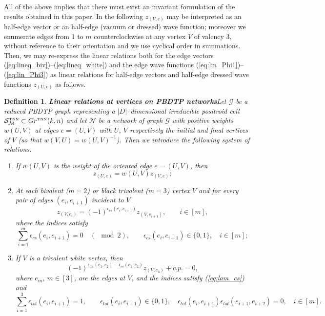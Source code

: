 \documentclass[11pt]{amsart}
\theoremstyle{plain}
\numberwithin{equation}{section}
\newtheorem{definition}{Definition}[subsection]
\def \GTNN {{Gr^{\mbox{\tiny TNN}} (k,n)}}
\def \S {{\mathcal S}_{\mathcal M}^{\mbox{\tiny TNN}}}
\begin{document}
All of the above implies that there must exist an invariant formulation of the results obtained in this paper.
In the following $z_{(V,e)}$ may be interpreted as an half-edge vector or an half-edge (vacuum or dressed) wave function; moreover we enumerate edges from 1 to $m$ counterclockwise at any vertex $V$ of valency $3$, without reference to their orientation and we use cyclical order in summations.
Then, we may re-express the linear relations both for the edge vectors (\ref{eq:lineq_biv})--(\ref{eq:lineq_white}) and the edge wave functions (\ref{eq:lin_Phi1})--(\ref{eq:lin_Phi3}) as linear relations for half-edge vectors and half-edge dressed wave functions $z_{(U,e)}$ as follows.
\begin{definition}\textbf{Linear relations at vertices on PBDTP networks}\label{def:sign_rela}
Let $\mathcal G$ be a reduced PBDTP graph representing a $|D|$--dimensional irreducible positroid cell $\S \subset \GTNN$ and let $\mathcal N$ be a network of graph $\mathcal G$ with positive weights $w(U,V)$ at edges $e=(U,V)$ with  $U$, $V$ respectively the initial and final vertices of $V$ (so that $w(V,U)= w(U,V)^{-1}$). Then we introduce the following system of relations:
\begin{enumerate}
\item  If $w(U,V)$ is the weight of the oriented edge $e=(U,V)$, then 
\begin{equation}\label{eq:lam_edge}
z_{(U,e)}=  w(U,V) z_{(V,e)};
\end{equation}
\item  At each bivalent ($m=2$) or black trivalent ($m=3$) vertex $V$ and for every pair of edges $(e_i,e_{i+1})$ incident to $V$ 
\begin{equation}\label{eq:lam_black}
z_{(V,e_i)} = (-1)^{\epsilon_{cs}(e_i,e_{i+1})} z_{(V,e_{i+1})}, \quad\quad i\in [m],
\end{equation}
where the indices satisfy 
\begin{equation}\label{eq:lam_cs}
\sum_{i=1}^m \epsilon_{cs}(e_i,e_{i+1}) =0 \quad (\!\!\!\!\!\!\mod 2), \quad\quad \epsilon_{cs}(e_i,e_{i+1}) \in \{0, 1\}, \quad i\in [m];
\end{equation}
\item  If $V$ is a trivalent white vertex, then 
\begin{equation}\label{eq:lam_white}
(-1)^{\epsilon_{tot} (e_1,e_2)-\epsilon_{cs} (e_1,e_2)  } z_{(V,e_3)} +  c.p. =0,
\end{equation}
where $e_m$, $m\in [3]$, are the edges at $V$, and the indices satisfy (\ref{eq:lam_cs}) and
\begin{equation}\label{eq:lam_tot}
\sum_{i=1}^3 \epsilon_{tot}(e_i,e_{i+1}) =1, \quad\quad \epsilon_{tot}(e_i,e_{i+1}) \in \{ 0, 1\}, \quad
\epsilon_{tot}(e_i,e_{i+1})\epsilon_{tot}(e_{i+1},e_{i+2}) =0, \quad i\in [m].
\end{equation}
\end{enumerate}
\end{definition}
\end{document}

